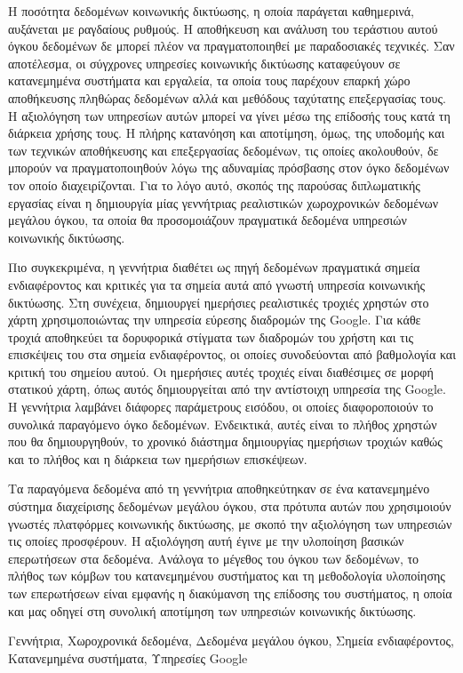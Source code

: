 
\begin{abstractgr}%

Η ποσότητα δεδομένων κοινωνικής δικτύωσης, η οποία παράγεται καθημερινά, αυξάνεται με ραγδαίους ρυθμούς. Η αποθήκευση και ανάλυση του τεράστιου αυτού όγκου δεδομένων 
δε μπορεί πλέον να πραγματοποιηθεί με παραδοσιακές τεχνικές. Σαν αποτέλεσμα, οι σύγχρονες υπηρεσίες κοινωνικής δικτύωσης καταφεύγουν σε κατανεμημένα συστήματα και εργαλεία, 
τα οποία τους παρέχουν επαρκή χώρο αποθήκευσης πληθώρας δεδομένων αλλά και μεθόδους ταχύτατης \linebreak επεξεργασίας τους. Η αξιολόγηση των υπηρεσίων αυτών μπορεί να γίνει 
μέσω της επίδοσής τους κατά τη διάρκεια χρήσης τους. Η πλήρης κατανόηση και αποτίμηση, όμως, της υποδομής και των τεχνικών αποθήκευσης και επεξεργασίας δεδομένων, τις 
οποίες ακολουθούν, δε μπορούν να πραγματοποιηθούν λόγω της αδυναμίας πρόσβασης στον όγκο δεδομένων τον οποίο διαχειρίζονται. Για το λόγο αυτό, σκοπός της 
παρούσας διπλωματικής εργασίας είναι η δημιουργία μίας γεννήτριας ρεαλιστικών χωροχρονικών δεδομένων μεγάλου όγκου, τα οποία θα προσομοιάζουν πραγματικά δεδομένα 
υπηρεσιών κοινωνικής δικτύωσης. 

Πιο συγκεκριμένα, η γεννήτρια διαθέτει ως πηγή δεδομένων πραγματικά σημεία ενδιαφέροντος και κριτικές για τα σημεία αυτά από γνωστή υπηρεσία κοινωνικής δικτύωσης. 
Στη συνέχεια, δημιουργεί ημερήσιες ρεαλιστικές τροχιές χρηστών στο χάρτη χρησιμοποιώντας την υπηρεσία εύρεσης διαδρομών της Google. Για κάθε τροχιά αποθηκεύει 
τα δορυφορικά στίγματα των \linebreak διαδρομών του χρήστη και τις επισκέψεις του στα σημεία ενδιαφέροντος, οι οποίες συνοδεύονται από βαθμολογία και κριτική του σημείου αυτού. 
Οι ημερήσιες αυτές τροχιές είναι διαθέσιμες σε μορφή στατικού χάρτη, όπως αυτός δημιουργείται από την αντίστοιχη υπηρεσία της Google. Η γεννήτρια λαμβάνει διάφορες 
παράμετρους εισόδου, οι οποίες διαφοροποιούν το συνολικά παραγόμενο όγκο δεδομένων. Ενδεικτικά, αυτές είναι το πλήθος χρηστών που θα δημιουργηθούν, το 
χρονικό διάστημα δημιουργίας ημερήσιων τροχιών καθώς και το πλήθος και η διάρκεια των ημερήσιων επισκέψεων. 

Τα παραγόμενα δεδομένα από τη γεννήτρια αποθηκεύτηκαν σε ένα κατανεμημένο σύστημα διαχείρισης δεδομένων μεγάλου όγκου, στα πρότυπα αυτών που χρησιμοιούν γνωστές 
πλατφόρμες κοινωνικής δικτύωσης, με σκοπό την αξιολόγηση των υπηρεσιών τις οποίες προσφέρουν. Η αξιολόγηση αυτή έγινε με την υλοποίηση βασικών επερωτήσεων στα δεδομένα. 
Ανάλογα το μέγεθος του όγκου των δεδομένων, το πλήθος των κόμβων του κατανεμημένου συστήματος και τη μεθοδολογία υλοποίησης των 
επερωτήσεων είναι εμφανής η διακύμανση της επίδοσης του συστήματος, η οποία και μας οδηγεί στη συνολική αποτίμηση των υπηρεσιών κοινωνικής δικτύωσης. 


  \begin{keywordsgr}
  Γεννήτρια, Χωροχρονικά δεδομένα, Δεδομένα μεγάλου όγκου, Σημεία ενδιαφέροντος, \linebreak Κατανεμημένα συστήματα, Υπηρεσίες Google
  \end{keywordsgr}
\end{abstractgr}
